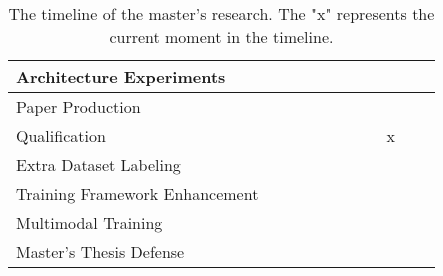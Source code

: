\begin{table}[ht]
\begin{tabular}{lllllllllll}
Architecture Experiments                              &                          &                          &                          &                          &                          & \cellcolor[HTML]{96FFFB} & \cellcolor[HTML]{96FFFB} &                                              &                                              &                          \\ \hline
Paper Production                                      &                          &                          &                          &                          &                          &                          &                          & \cellcolor[HTML]{96FFFB}                     &                                              &                          \\ \hline
Qualification                                         &                          &                          &                          &                          &                          &                          & \multicolumn{1}{c}{}     & \multicolumn{1}{c}{\cellcolor[HTML]{FD6864}x} &  &                          \\ \hline
Extra Dataset Labeling                                &                          &                          &                          &                          &                          &                          &                          &                                  \cellcolor[HTML]{FFFFC7}             & \cellcolor[HTML]{FFFFC7}                     &     \cellcolor[HTML]{FFFFC7}                     \\ \hline
Training Framework Enhancement                        &                          &                          &                          &                          &                          &                          &                          &                               \cellcolor[HTML]{FFFC9E}                & \cellcolor[HTML]{FFFC9E}                     & \cellcolor[HTML]{FFFC9E} \\ \hline
Multimodal Training                        &                          &                          &                          &                          &                          &                          &                          &                                           & \cellcolor[HTML]{FFFC9E}                     & \cellcolor[HTML]{FFFC9E} \\ \hline
Master’s Thesis Defense                               &                          &                          &                          &                          &                          &                          &                          &                                              &                                              & \cellcolor[HTML]{FD6864} \\ \hline
\end{tabular}
\caption{The timeline of the master's research. The "x" represents the current moment in the timeline.}
\end{table}